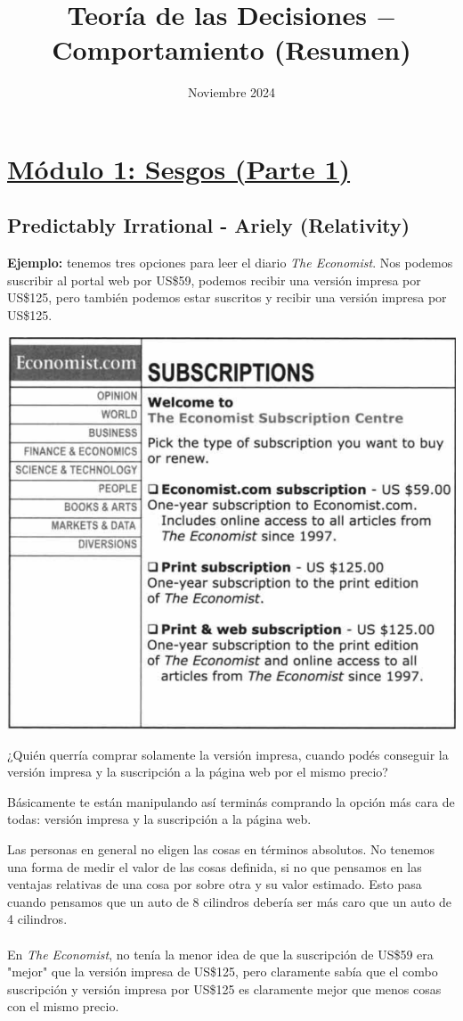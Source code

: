 \documentclass{article}
\title{Teoría de las Decisiones $-$ Comportamiento (Resumen)}
\date{Noviembre 2024}
\begin{document}
    \maketitle
    \thispagestyle{main} %

    \section*{\underline{Módulo 1: Sesgos (Parte 1)}}
        \subsection*{Predictably Irrational - Ariely (Relativity)}
            \textbf{Ejemplo:} tenemos tres opciones para leer el diario \textit{The Economist}. Nos podemos suscribir al portal web por US\$59, podemos recibir una versión impresa por US\$125, pero también podemos estar suscritos y recibir una versión impresa por US\$125.
            \begin{center}
                \includegraphics[width=0.5 \linewidth]{figs/sesgos.png}
            \end{center}
            ¿Quién querría comprar solamente la versión impresa, cuando podés conseguir la versión impresa y la suscripción a la página web por el mismo precio?

            Básicamente te están manipulando así terminás comprando la opción más cara de todas: versión impresa y la suscripción a la página web.

            Las personas en general no eligen las cosas en términos absolutos. No tenemos una forma de medir el valor de las cosas definida, si no que pensamos en las ventajas relativas de una cosa por sobre otra y su valor estimado. Esto pasa cuando pensamos que un auto de 8 cilindros debería ser más caro que un auto de 4 cilindros.
            \\
            \\
            En \textit{The Economist}, no tenía la menor idea de que la suscripción de US\$59 era "mejor" que la versión impresa de US\$125, pero claramente sabía que el combo suscripción y versión impresa por US\$125 es claramente mejor que menos cosas con el mismo precio.
\end{document}
